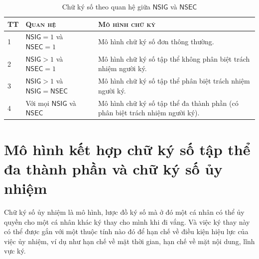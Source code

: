 \begin{table}
	\centering
	\caption{Chữ ký số theo quan hệ giữa $\mathsf{NSIG}$ và $\mathsf{NSEC}$}
	\label{bang1}
	\begin{tabular}{l l p{6cm}}
		\toprule[0.125em]
		{\textsc{TT}} & {\textsc{Quan hệ}} & \textsc{{Mô hình chữ ký}}\\\toprule[0.125em]%
		1 & $\mathsf{NSIG}=1$ và $\mathsf{NSEC}=1$ & Mô hình chữ ký số đơn thông thường.\\  \midrule
		2 & $\mathsf{NSIG}>1$ và $\mathsf{NSEC}=1$ & Mô hình chữ ký số tập thể không phân biệt trách nhiệm người ký.\\\midrule
		3 & $\mathsf{NSIG}>1$ và $\mathsf{NSIG}=\mathsf{NSEC}$ & Mô hình chữ ký số tập thể phân biệt trách nhiệm người ký.\\\midrule
		4 & Với mọi $\mathsf{NSIG}$ và $\mathsf{NSEC}$  & Mô hình chữ ký số tập thể đa thành phần (có phân biệt trách nhiệm người ký).\\\bottomrule[0.125em]
	\end{tabular}
\end{table}


\section{\bf Mô hình kết hợp chữ ký số tập thể đa thành phần và chữ ký số ủy nhiệm }

Chữ ký số ủy nhiệm là mô hình, lược đồ ký số mà ở đó một cá nhân có thể ủy quyền cho một cá nhân khác ký thay cho mình khi đi vắng. Và việc ký thay này có thể được gắn với một thuộc tính nào đó để hạn chế về điều kiện hiệu lực của việc ủy nhiệm, ví dụ như hạn chế về mặt thời gian, hạn chế về mặt nội dung, lĩnh vực ký.

